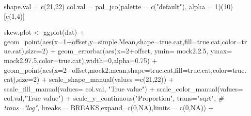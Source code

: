 \documentclass[
]{article}
\newenvironment{Shaded}{\begin{snugshade}}{\end{snugshade}}
\newcommand{\AttributeTok}[1]{\textcolor[rgb]{0.77,0.63,0.00}{#1}}
\newcommand{\CommentTok}[1]{\textcolor[rgb]{0.56,0.35,0.01}{\textit{#1}}}
\newcommand{\ConstantTok}[1]{\textcolor[rgb]{0.00,0.00,0.00}{#1}}
\newcommand{\DecValTok}[1]{\textcolor[rgb]{0.00,0.00,0.81}{#1}}
\newcommand{\FloatTok}[1]{\textcolor[rgb]{0.00,0.00,0.81}{#1}}
\newcommand{\FunctionTok}[1]{\textcolor[rgb]{0.00,0.00,0.00}{#1}}
\newcommand{\NormalTok}[1]{#1}
\newcommand{\OtherTok}[1]{\textcolor[rgb]{0.56,0.35,0.01}{#1}}
\newcommand{\SpecialCharTok}[1]{\textcolor[rgb]{0.00,0.00,0.00}{#1}}
\newcommand{\StringTok}[1]{\textcolor[rgb]{0.31,0.60,0.02}{#1}}
\begin{document}
\begin{Shaded}
\begin{Highlighting}[]
\NormalTok{    shape.val }\OtherTok{=} \FunctionTok{c}\NormalTok{(}\DecValTok{21}\NormalTok{,}\DecValTok{22}\NormalTok{)}
\NormalTok{    col.val }\OtherTok{=} \FunctionTok{pal\_jco}\NormalTok{(}\AttributeTok{palette =} \FunctionTok{c}\NormalTok{(}\StringTok{"default"}\NormalTok{), }\AttributeTok{alpha =} \DecValTok{1}\NormalTok{)(}\DecValTok{10}\NormalTok{)[}\FunctionTok{c}\NormalTok{(}\DecValTok{1}\NormalTok{,}\DecValTok{4}\NormalTok{)]}
  
\NormalTok{  skew.plot }\OtherTok{\textless{}{-}}  \FunctionTok{ggplot}\NormalTok{(dat) }\SpecialCharTok{+}
    \FunctionTok{geom\_point}\NormalTok{(}\FunctionTok{aes}\NormalTok{(}\AttributeTok{x=}\DecValTok{1}\SpecialCharTok{+}\NormalTok{offset,}\AttributeTok{y=}\NormalTok{simple.Mean,}\AttributeTok{shape=}\NormalTok{true.cat,}\AttributeTok{fill=}\NormalTok{true.cat,}\AttributeTok{color=}\NormalTok{true.cat),}\AttributeTok{size=}\DecValTok{2}\NormalTok{) }\SpecialCharTok{+}
    \FunctionTok{geom\_errorbar}\NormalTok{(}\FunctionTok{aes}\NormalTok{(}\AttributeTok{x=}\DecValTok{2}\SpecialCharTok{+}\NormalTok{offset,}
                      \AttributeTok{ymin=}\NormalTok{ mock2.}\FloatTok{2.5}\NormalTok{, }
                      \AttributeTok{ymax=}\NormalTok{ mock2.}\FloatTok{97.5}\NormalTok{,}\AttributeTok{color=}\NormalTok{true.cat),}\AttributeTok{width=}\DecValTok{0}\NormalTok{,}\AttributeTok{alpha=}\FloatTok{0.75}\NormalTok{)   }\SpecialCharTok{+}
    \FunctionTok{geom\_point}\NormalTok{(}\FunctionTok{aes}\NormalTok{(}\AttributeTok{x=}\DecValTok{2}\SpecialCharTok{+}\NormalTok{offset,mock2.mean,}\AttributeTok{shape=}\NormalTok{true.cat,}\AttributeTok{fill=}\NormalTok{true.cat,}\AttributeTok{color=}\NormalTok{true.cat),}\AttributeTok{size=}\DecValTok{2}\NormalTok{) }\SpecialCharTok{+}
    \FunctionTok{scale\_shape\_manual}\NormalTok{(}\AttributeTok{values =}\FunctionTok{c}\NormalTok{(}\DecValTok{21}\NormalTok{,}\DecValTok{22}\NormalTok{)) }\SpecialCharTok{+}
    \FunctionTok{scale\_fill\_manual}\NormalTok{(}\AttributeTok{values=}\NormalTok{ col.val, }\StringTok{"True value"}\NormalTok{) }\SpecialCharTok{+}
    \FunctionTok{scale\_color\_manual}\NormalTok{(}\AttributeTok{values=}\NormalTok{ col.val,}\StringTok{"True value"}\NormalTok{) }\SpecialCharTok{+}
    \FunctionTok{scale\_y\_continuous}\NormalTok{(}\StringTok{"Proportion"}\NormalTok{,}
                       \AttributeTok{trans=}\StringTok{"sqrt"}\NormalTok{,}
                       \CommentTok{\# trans="log",}
                       \AttributeTok{breaks =}\NormalTok{ BREAKS,}\AttributeTok{expand=}\FunctionTok{c}\NormalTok{(}\DecValTok{0}\NormalTok{,}\ConstantTok{NA}\NormalTok{),}\AttributeTok{limits =} \FunctionTok{c}\NormalTok{(}\DecValTok{0}\NormalTok{,}\ConstantTok{NA}\NormalTok{)) }\SpecialCharTok{+}

\end{Highlighting}
\end{Shaded}
\end{document}
